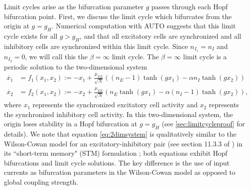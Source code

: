 \documentclass[reqno]{siamonline190516}
\begin{document}
Limit cycles arise as the bifurcation parameter $g$ passes through each Hopf bifurcation point. First, we discuss the limit cycle which bifurcates from the origin at $g = g_H$. Numerical computation with AUTO \cite{AUTO} suggests that this limit cycle exists for all $g > g_H$, and that all excitatory cells are synchronized and all inhibitory cells are synchronized within this limit cycle. Since $n_{I_1} = n_I$ and $n_{I_2} = 0$, we will call this the $\beta=\infty$ limit cycle. The $\beta = \infty$ limit cycle is a periodic solution to the two-dimensional system
\begin{equation}\label{eq:2dimsystem}
\begin{aligned}
\dot{x_1} &= f_1(x_1, x_2) := -x_1 + \frac{\mu_{EE}}{\sqrt{N}}\left((n_E - 1) \tanh(g x_1) - \alpha n_I \tanh(g x_2) \right) \\
\dot{x_2} &= f_2(x_1, x_2) := -x_2 + \frac{\mu_{EE}}{\sqrt{N}}\left( n_E \tanh(g x_1) - \alpha (n_I - 1) \tanh(g x_2) \right), 
\end{aligned}
\end{equation}
where $x_1$ represents the synchronized excitatory cell activity and $x_2$ represents the synchronized inhibitory cell activity. In this two-dimensional system, the origin loses stability in a Hopf bifurcation at $g = g_H$ (see \cref{sec:limitcycleproof} for details). We note that equation \cref{eq:2dimsystem} is qualitatively similar to the Wilson-Cowan model for an excitatory-inhibitory pair (see section 11.3.3 of \cite{et10}) in its ``short-term memory" (STM) formulation \cite{Chow_Y_JNeurophys_2020}; both equations exhibit Hopf bifurcations and limit cycle solutions. The key difference is the use of input currents as bifurcation parameters in the Wilson-Cowan model as opposed to global coupling strength.
\end{document}

